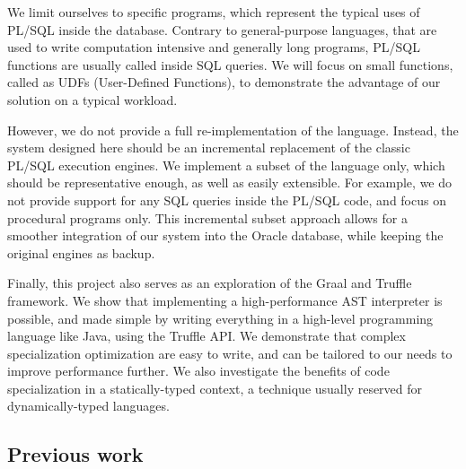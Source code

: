 \documentclass[twoside,11pt,a4paper]{article}
\begin{document}
We limit ourselves to specific programs, which represent the typical uses of PL/SQL inside the database. Contrary to general-purpose languages, that are used to write computation intensive and generally long programs, PL/SQL functions are usually called inside SQL queries. We will focus on small functions, called as UDFs (User-Defined Functions), to demonstrate the advantage of our solution on a typical workload.


However, we do not provide a full re-implementation of the language. Instead, the system designed here should be an incremental replacement of the classic PL/SQL execution engines. We implement a subset of the language only, which should be representative enough, as well as easily extensible. For example, we do not provide support for any SQL queries inside the PL/SQL code, and focus on procedural programs only. This incremental subset approach allows for a smoother integration of our system into the Oracle database, while keeping the original engines as backup.

Finally, this project also serves as an exploration of the Graal and Truffle framework. We show that implementing a high-performance AST interpreter is possible, and made simple by writing everything in a high-level programming language like Java, using the Truffle API. We demonstrate that complex specialization optimization are easy to write, and can be tailored to our needs to improve performance further. We also investigate the benefits of code specialization in a statically-typed context, a technique usually reserved for dynamically-typed languages.

\subsection{Previous work}
\end{document}
